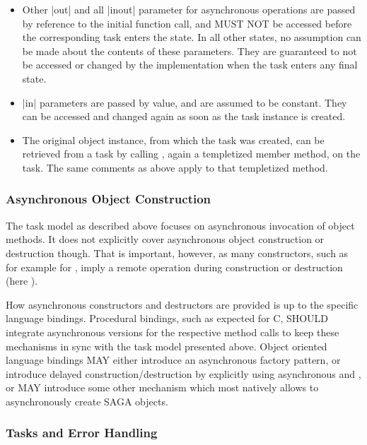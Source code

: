 \begin{itemize}
   \item Other |out| and all |inout| parameter for
   asynchronous operations are passed by reference to the
   initial function call, and MUST NOT be accessed before the
   corresponding task enters the  state.  In all
   other states, no assumption can be made about the contents of
   these parameters.  They are guaranteed to not be
   accessed or changed by the implementation when the task
   enters any final state.
   
   \item |in| parameters are passed by value, and are assumed to
   be constant.  They can be accessed and changed again as soon
   as the task instance is created.
 
   \item The original object instance, from which the task was
   created, can be retrieved from a task by calling
   , again a templetized
   member method, on the task.  The same comments as above apply
   to that templetized method.
 
 \end{itemize}
 
 
 \subsubsection*{Asynchronous Object Construction}
 
  The task model as described above focuses on
  asynchronous invocation of object methods.  It does not
  explicitly cover asynchronous object construction or
  destruction though.  That is important, however, as many
  constructors, such as for example for , imply a
  remote operation during construction or destruction (here
  ).
  
  How asynchronous constructors and destructors are
  provided is up to the specific language bindings.  Procedural
  bindings, such as expected for C, SHOULD integrate
  asynchronous versions for the respective method calls to keep
  these mechanisms in sync with the task model presented above.
  Object oriented language bindings MAY either introduce an
  asynchronous factory pattern, or introduce delayed
  construction/destruction by explicitly using asynchronous
   and , or MAY introduce some other
  mechanism which most natively allows to asynchronously create
  SAGA objects.
 
 
 \subsubsection*{Tasks and Error Handling}
 
